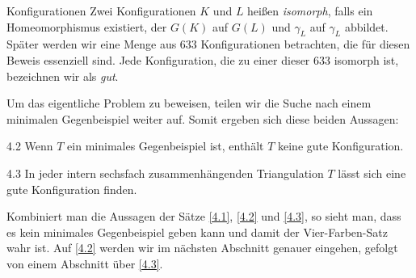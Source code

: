 \begin{section}{Konfigurationen}
   Zwei Konfigurationen $K$ und $L$ heißen \textit{isomorph}, falls ein Homeomorphismus existiert, der $G(K)$ auf $G(L)$ und $\gamma_L$ auf $\gamma_L$ abbildet. Später werden wir eine Menge aus 633 Konfigurationen betrachten, die für diesen Beweis essenziell sind. Jede Konfiguration, die zu einer dieser 633 isomorph ist, bezeichnen wir als \textit{gut}. 
   
   Um das eigentliche Problem zu beweisen, teilen wir die Suche nach einem minimalen Gegenbeispiel weiter auf. Somit ergeben sich diese beiden Aussagen:
   
   \begin{satzl}{}{4.2}
    Wenn $T$ ein minimales Gegenbeispiel ist, enthält $T$ keine gute Konfiguration.
   \end{satzl}
   
   \begin{satzl}{}{4.3}
    In jeder intern sechsfach zusammenhängenden Triangulation $T$ lässt sich eine gute Konfiguration finden.
   \end{satzl}
   
   Kombiniert man die Aussagen der Sätze \ref{4.1}, \ref{4.2} und \ref{4.3}, so sieht man, dass es kein minimales Gegenbeispiel geben kann und damit der Vier-Farben-Satz wahr ist. Auf \ref{4.2} werden wir im nächsten Abschnitt genauer eingehen, gefolgt von einem Abschnitt über \ref{4.3}. 
\end{section}